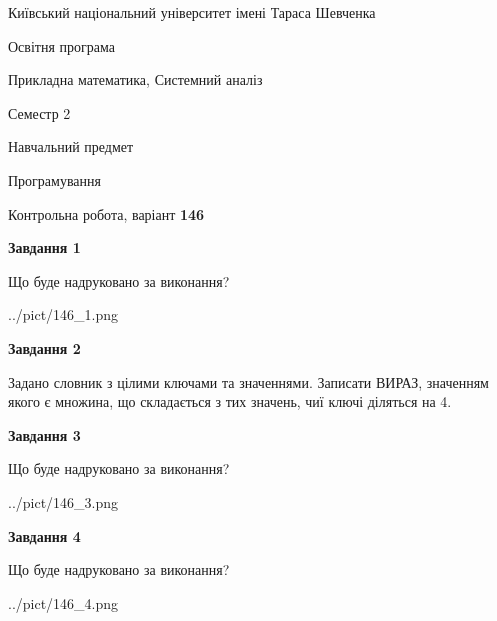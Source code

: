 \documentclass[12pt, ukrainian]{article}
\begin{document}
{{\begin {small}\par
{ \center  Київський національний університет імені Тараса Шевченка \par}
{\parbox {5 cm}{Освітня програма \hfill}{\parbox {8 cm}{Прикладна математика, Системний аналіз \hfill}}\parbox {5 cm}{\hfill Семестр 2}}\par
{\parbox {5 cm} {Навчальний предмет \hfill}\parbox {7 cm}{Програмування \hfill}\parbox {6cm}{\hfill}\par}\vspace{-7pt} \end{small}}{\center Контрольна робота, варіант  \No \textbf
{ 146 }\par}}
{
\begin {large}
{\begin {center}\textbf{Завдання 1}\end {center}}\par
Що буде надруковано за виконання?\par\par
\begin{center}
	{../pict/146_1.png}
\end{center}
\newpage

{\begin {center}\textbf{Завдання 2}\end {center}}\par
Задано словник  з цілими ключами та значеннями. Записати ВИРАЗ, значенням якого є множина, що складається  з тих значень, чиї ключі діляться на 4.\par
\newpage

{\begin {center}\textbf{Завдання 3}\end {center}}\par
Що буде надруковано за виконання?\par
\begin{center}
	{../pict/146_3.png}
\end{center}
\newpage

{\begin {center}\textbf{Завдання 4}\end {center}}\par
Що буде надруковано за виконання?\par
\begin{center}
	{../pict/146_4.png}
\end{center}
\newpage


\end{large}}
\end{document}
